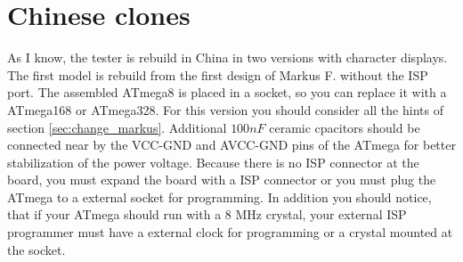 \section{Chinese clones}
As I know, the tester is rebuild in China in two versions with character displays.
The first model is rebuild from the first design of Markus F. without the ISP port.
The assembled ATmega8 is placed in a socket, so you can replace it with a ATmega168 or ATmega328.
For this version you should consider all the hints of section \ref{sec:change_markus}.
Additional \(100nF\) ceramic cpacitors should be connected near by the VCC-GND and AVCC-GND pins of
the ATmega for better stabilization of the power voltage.
Because there is no ISP connector at the board, you must expand the board with a ISP connector or you
must plug the ATmega to a external socket for programming.
In addition you should notice, that if your ATmega should run with a 8 MHz crystal,
your external ISP programmer must have a external clock for programming or a crystal mounted at the socket.\\

